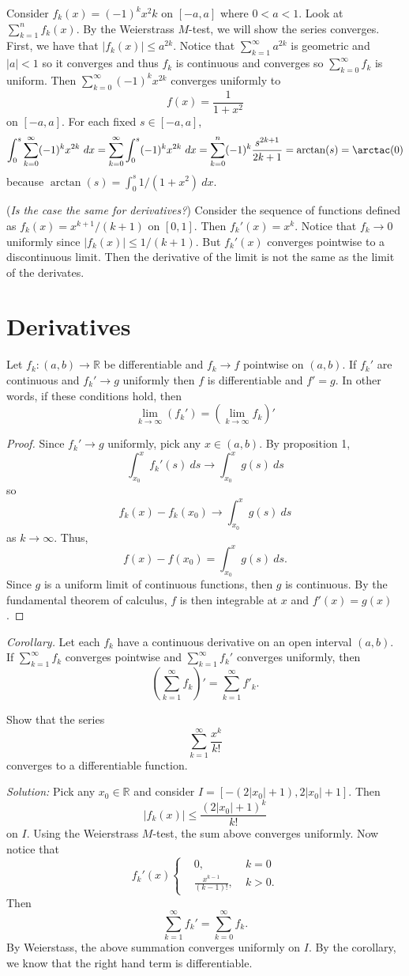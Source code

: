 \documentclass[11pt]{article}
\theoremstyle{definition}
\newcommand{\R}{\mathbb{R}}                      %
\begin{document}
\ex Consider $f_k(x)=(-1)^kx^2k$ on $[-a,a]$ where $0<a<1$. Look at $\sum_{k=1}^nf_k(x)$. By the Weierstrass $M$-test, we will show the series converges. First, we have that $|f_k(x)|\leq a^{2k}$. Notice that $\sum_{k=1}^\infty a^{2k}$ is geometric and $|a|<1$ so it converges and thus $f_k$ is continuous and converges so $\sum_{k=0}^\infty f_k$ is uniform. Then $\sum_{k=0}^\infty (-1)^kx^{2k}$ converges uniformly to 
$$
f(x)=\frac{1}{1+x^2}
$$
on $[-a,a]$. For each fixed $s\in [-a,a]$,
$$
\int_0^s \sum_{k=0}^\infty (-1)^kx^{2k}~dx =\sum_{k=0}^\infty \int_0^s  (-1)^kx^{2k}~dx =\sum_{k=0}^n (-1)^k\frac{s^{2k+1}}{2k+1}=\arctan(s)=\arctac(0)
$$
because $\arctan(s)=\int_{0}^s 1/(1+x^2)~dx$.


\ex (\textit{Is the case the same for derivatives?}) Consider the sequence of functions defined as $f_k(x)=x^{k+1}/(k+1)$ on $[0,1]$. Then $f_k'(x)=x^k$. Notice that $f_k\to 0$ uniformly since $|f_k(x)|\leq 1/(k+1)$. But $f_k'(x)$ converges pointwise to a  discontinuous limit. Then the derivative of the limit is not the same as the limit of the derivates. 
\section{Derivatives}
\prop Let $f_k:(a,b)\to\R$ be differentiable and $f_k\to f$ pointwise on $(a,b)$. If $f_k'$ are continuous and $f_k'\to g$ uniformly then $f$ is differentiable and $f'=g$. In other words, if these conditions hold, then
$$
\lim_{k\to\infty} \left(f_k'\right)=\left(\lim_{k\to\infty} f_k\right)'
$$
\begin{proof}
    Since $f_k'\to g$ uniformly, pick any $x\in (a,b)$. By proposition 1,
    $$
    \int_{x_0}^x f_k'(s)~ds\to\int_{x_0}^x g(s)~ds
    $$
    so 
    $$
    f_k(x)-f_k(x_0)\to \int_{x_0}^x g(s)~ds
    $$
    as $k\to\infty$. Thus,
    $$
    f(x)-f(x_0)=\int_{x_0}^x g(s)~ds.
    $$
    Since $g$ is a uniform limit of continuous functions, then $g$ is continuous. By the fundamental theorem of calculus, $f$ is then integrable at $x$ and $f'(x)=g(x)$.
\end{proof}

\textit{Corollary.} Let each $f_k$ have a continuous derivative on an open interval $(a,b)$. If $\sum_{k=1}^\infty f_k$ converges pointwise and $\sum_{k=1}^\infty f_k'$ converges uniformly, then 
$$
\left(\sum_{k=1}^\infty f_k\right)'=\sum_{k=1}^\infty f'_k.
$$

\ex Show that the series
$$
\sum_{k=1}^\infty \frac{x^k}{k!}
$$
converges to a differentiable function.

\textit{Solution:} Pick any $x_0\in \R$ and consider $I=[-(2|x_0|+1), 2|x_0|+1]$. Then
$$
|f_k(x)|\leq \frac{(2|x_0|+1)^k}{k!}
$$
on $I$. Using the Weierstrass $M$-test, the sum above converges uniformly. Now notice that
$$
f_k'(x)\left\{\begin{aligned}
    &0,&\;k=0\\
    &\frac{x^{k-1}}{(k-1)!},&\;k>0. 
\end{aligned}\right.
$$
Then $$
\sum_{k=1}^\infty f_k'=\sum_{k=0}^\infty f_k.
$$
By Weierstass, the above summation converges uniformly on $I$. By the corollary, we know that the right hand term is differentiable.
 
\end{document}
